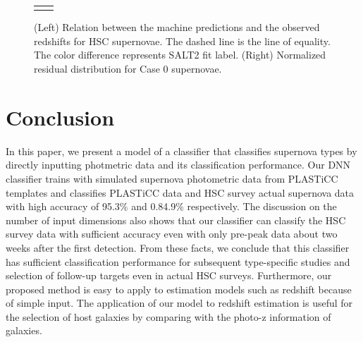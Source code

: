 \documentclass[useamsfonts]{pasj01}
\begin{document}
\begin{figure}[ht]
\begin{tabular}{cc}
\begin{minipage}{0.5\hsize}
\begin{center}
            \end{center}
        \end{minipage}
    \end{tabular}  \caption{%
    (Left) Relation between the machine predictions and the observed redshifts for HSC supernovae.
    The dashed line is the line of equality.
    The color difference represents SALT2 fit label.
    (Right) Normalized residual distribution for Case 0 supernovae.
    }%
    \label{fig:redshift_estimation}
\end{figure}
%
%
%
\section{Conclusion}
%
In this paper, we present a model of a classifier that classifies supernova types by directly inputting photmetric data and its classification performance.
Our DNN classifier trains with simulated supernova photometric data from PLASTiCC templates and classifies PLASTiCC data and HSC survey actual supernova data with high accuracy of 95.3\% and 0.84.9\% respectively.
The discussion on the number of input dimensions also shows that our classifier can classify the HSC survey data with sufficient accuracy even with only pre-peak data about two weeks after the first detection.
From these facts, we conclude that this classifier has sufficient classification performance for subsequent type-specific studies and selection of follow-up targets even in actual HSC surveys.
Furthermore, our proposed method is easy to apply to estimation models such as redshift because of simple input. The application of our model to redshift estimation is useful for the selection of host galaxies by comparing with the photo-z information of galaxies.
%
\end{document}
